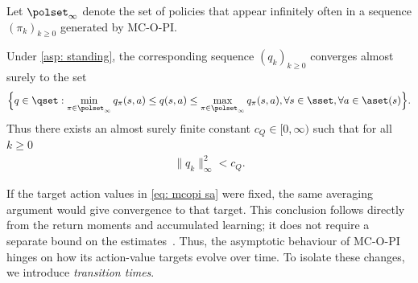 \begin{lemma}

\label{thm: bounded limit sets}
Let $\polset_\infty$ denote the set of policies that appear infinitely often in a sequence $(\pi_k)_{k \ge 0}$ generated by MC-O-PI.




Under \autoref{asp: standing}, the corresponding sequence $(q_k)_{k \ge 0}$ converges almost surely to the set
\begin{align*}
    \Big\{
    q \in \qset : 
    \min_{\pi \in \polset_\infty} q_\pi(s,a) \leq q(s,a) \leq \max_{\pi \in \polset_\infty} q_\pi(s,a), \forall s \in \sset, \forall a \in \aset(s)
    \Big\} .
\end{align*}
Thus
there exists an almost surely finite constant $c_Q \in [0, \infty)$ such that for all $k \geq 0$
    \begin{align*}
        \| q_k \|_\infty^2 < c_Q .
    \end{align*}
\end{lemma}




























































If the target action values in \eqref{eq: mcopi sa} were fixed, the same averaging argument would give convergence to that target. This conclusion follows directly from the return moments and accumulated learning; it does not require a separate bound on the estimates~\citep[Proposition~4.2]{Bertsekas1996Neuro-DynamicProgramming}.
Thus, the asymptotic behaviour of MC-O-PI hinges on how its action-value targets evolve over time. To isolate these changes, we introduce \textit{transition times}.

